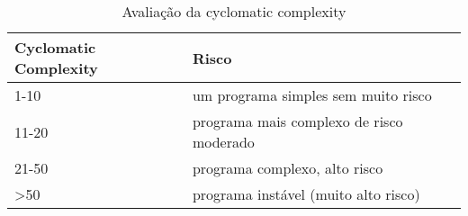 \begin{table}[htbp]
\begin{center}
\begin{tabular}{|l|l|}\hline
Cyclomatic Complexity & Risco \\\hline
1-10  & um programa simples sem muito risco\\\hline
11-20 & programa mais complexo de risco moderado\\\hline
21-50  & programa complexo, alto risco\\\hline
>50  & programa instável (muito alto risco)\\\hline
\end{tabular}
\caption{Avaliação da cyclomatic complexity}
\end{center}
\end{table}

